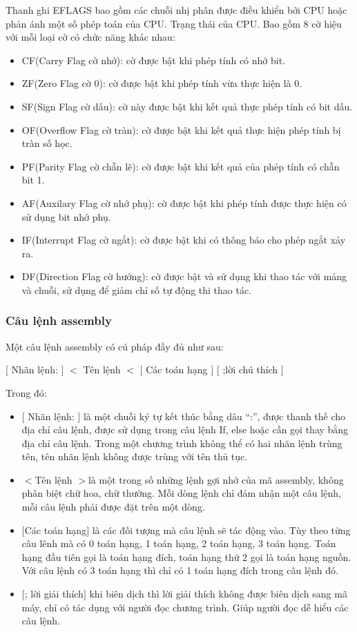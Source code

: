 	Thanh ghi EFLAGS bao gồm các chuỗi nhị phân được điều khiển bởi CPU hoặc phản ánh một số phép toán của CPU. Trạng thái của CPU. Bao gồm 8 cờ hiệu với mỗi loại cờ có chức năng khác nhau:
\begin{itemize}
	\renewcommand{\labelitemi}{\textbullet}		
		\item CF(Carry Flag cờ nhớ): cờ được bật khi phép tính có nhớ bit.
		\item ZF(Zero Flag cờ 0): cờ được bật khi phép tính vừa thực hiện là 0.
\item SF(Sign Flag cờ dấu): cờ này được bật khi kết quả thực phép tính có bit dấu.
\item	OF(Overflow Flag cờ tràn): cờ được bật khi kết quả thực hiện phép tính bị tràn số học.
\item	PF(Parity Flag cờ chẵn lẽ): cờ được bật khi kết quả của phép tính có chẵn bit 1.
\item	AF(Auxilary Flag cờ nhớ phụ): cờ được bật khi phép tính được thực hiện có sử dụng bit nhớ phụ.
\item IF(Interrupt Flag cờ ngắt): cờ được bật khi có thông báo cho phép ngắt xảy ra.
\item DF(Direction Flag cờ hướng): cờ được bật và sử dụng khi thao tác với mảng và chuỗi, sử dụng để giảm chỉ số tự động thi thao tác.
\end{itemize}	

		\subsubsection{Câu lệnh assembly}
		Một câu lệnh assembly có cú pháp đầy đủ như sau: 
		 \begin{center}		 
			\selectfont
		 	$[ $ Nhãn lệnh: $]$  	$<$ Tên lệnh $<$ 	$[$ Các toán hạng $]$	$[$ ;lời chú thích $]$ \\
		 \end{center}			
		Trong đó:
		
		\begin{itemize}
		\renewcommand{\labelitemi}{\textbullet}		
		\item $[$ Nhãn lệnh: $]$  là một chuỗi ký tự kết thúc bằng dâu “:”, được thanh thế cho địa chỉ câu lệnh, được sử dụng trong câu lệnh If, else hoặc cần gọi thay bằng địa chỉ câu lệnh. Trong một chương trình không thể có hai nhãn lệnh trùng tên, tên nhãn lệnh không được trùng với tên thủ tục.
		\item $<$Tên lệnh $>$là một trong số những lệnh gợi nhớ của mã assembly, không phân biệt chữ hoa, chữ thường. Mỗi dòng lệnh chỉ đảm nhận một câu lệnh, mỗi câu lệnh phải được đặt trên một dòng.
		\item $[$Các toán hạng$]$ là các đối tượng mà câu lệnh sẽ tác động vào. Tùy theo từng câu lênh mà có 0 toán hạng, 1 toán hạng, 2 toán hạng, 3 toán hạng. Toán hạng đầu tiên gọi là toán hạng đích, toán hạng thứ 2 gọi là toán hạng nguồn. Với câu lệnh có 3 toán hạng thì chỉ có 1 toán hạng đích trong câu lệnh đó. 
		\item $[$; lời giải thích$]$ khi biên dịch thì lời giải thích không được biên dịch sang mã máy, chỉ có tác dụng với người đọc chương trình. Giúp người đọc dễ hiểu các câu lệnh.
		\end{itemize}

